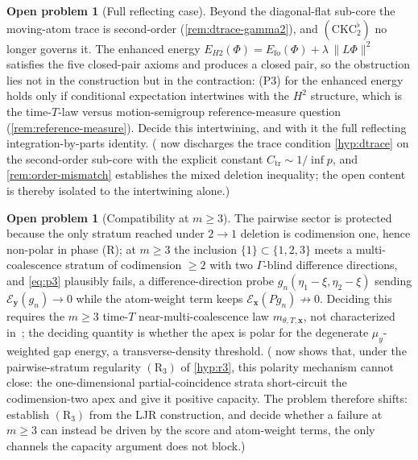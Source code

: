 \documentclass[reqno,final,11pt]{amsart}
\theoremstyle{plain}
\theoremstyle{definition}
\newtheorem{problem}[theorem]{Open problem}
\theoremstyle{remark}
\newcommand{\cE}{\mathcal E}
\begin{document}
\begin{problem}[Full reflecting case]\label{prob:fullreflecting}
Beyond the diagonal-flat sub-core the moving-atom trace is second-order
(\cref{rem:dtrace-gamma2}), and $(\mathrm{CKC}_2^{\flat})$ no longer governs it.
The enhanced energy $E_{H2}(\Phi)=E_{\mathrm{fo}}(\Phi)+\lambda\,\|L\Phi\|^2$
satisfies the five closed-pair axioms and produces a closed pair, so the
obstruction lies not in the construction but in the contraction:
\textnormal{(P3)} for the enhanced energy holds only if conditional expectation
intertwines with the $H^2$ structure, which is the time-$T$-law versus
motion-semigroup reference-measure question (\cref{rem:reference-measure}). Decide
this intertwining, and with it the full reflecting integration-by-parts identity.
( now discharges the trace condition \cref{hyp:dtrace} on the
second-order sub-core with the explicit constant
$C_{\mathrm{tr}}\sim1/\inf p$, and \cref{rem:order-mismatch} establishes the
mixed deletion inequality; the open content is thereby isolated to the
intertwining alone.)
\end{problem}

\begin{problem}[Compatibility at $m\ge3$]\label{prob:m3}
The pairwise sector is protected because the only stratum reached under $2\to1$
deletion is codimension one, hence non-polar in phase (R); at $m\ge3$ the
inclusion $\{1\}\subset\{1,2,3\}$ meets a multi-coalescence stratum of codimension
$\ge2$ with two $\Gamma$-blind difference directions, and \eqref{eq:p3} plausibly
fails, a difference-direction probe $g_n(\eta_1-\xi,\eta_2-\xi)$ sending
$\cE_{\mathbf y}(g_n)\to0$ while the atom-weight term keeps
$\cE_{\mathbf x}(Pg_n)\not\to0$. Deciding this requires the $m\ge3$ time-$T$
near-multi-coalescence law $m_{\theta,T,\mathbf x}$, not characterized
in~\citep{LJR-FCN,LJR-circle-noise}; the deciding quantity is whether the apex is polar
for the degenerate $\mu_y$-weighted gap energy, a transverse-density threshold.
( now shows that, under the pairwise-stratum regularity
$(\mathrm R_3)$ of \cref{hyp:r3}, this polarity mechanism cannot close:
the one-dimensional partial-coincidence strata short-circuit the
codimension-two apex and give it positive capacity. The problem therefore
shifts: establish $(\mathrm R_3)$ from the LJR construction, and decide whether
a failure at $m\ge3$ can instead be driven by the score and atom-weight terms,
the only channels the capacity argument does not block.)
\end{problem}
\end{document}
